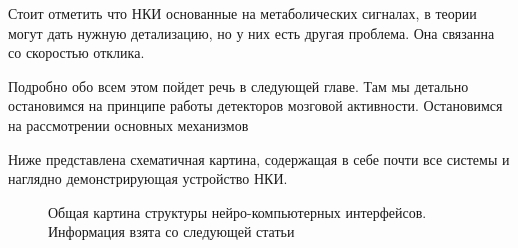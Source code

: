 Стоит отметить что НКИ основанные на метаболических сигналах, в теории могут дать нужную детализацию, но у них есть другая проблема. Она связанна со скоростью отклика. 

Подробно обо всем этом пойдет речь в следующей главе. Там мы детально остановимся на принципе работы детекторов мозговой активности. Остановимся на рассмотрении основных механизмов

\newpage
Ниже представлена схематичная картина, содержащая в себе почти все системы и наглядно демонстрирующая устройство НКИ.
\begin{figure}[h]
	\center{\texttt{[image: 7]}}
	\caption{Общая картина структуры нейро-компьютерных интерфейсов. Информация взята со следующей статьи\cite{review}}
	\label{fig:image}
\end{figure}
 
